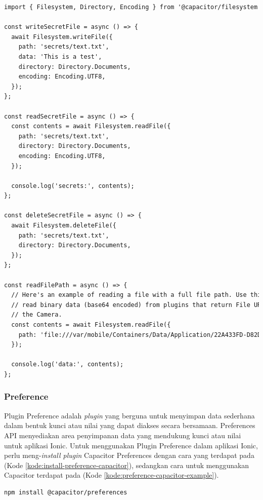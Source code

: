 \begin{lstlisting}[language=HTML, caption=Contoh Kode Penggunaan Filesystem, label=kode:example-of-filesystem-capacitor]
import { Filesystem, Directory, Encoding } from '@capacitor/filesystem';

const writeSecretFile = async () => {
  await Filesystem.writeFile({
    path: 'secrets/text.txt',
    data: 'This is a test',
    directory: Directory.Documents,
    encoding: Encoding.UTF8,
  });
};

const readSecretFile = async () => {
  const contents = await Filesystem.readFile({
    path: 'secrets/text.txt',
    directory: Directory.Documents,
    encoding: Encoding.UTF8,
  });

  console.log('secrets:', contents);
};

const deleteSecretFile = async () => {
  await Filesystem.deleteFile({
    path: 'secrets/text.txt',
    directory: Directory.Documents,
  });
};

const readFilePath = async () => {
  // Here's an example of reading a file with a full file path. Use this to
  // read binary data (base64 encoded) from plugins that return File URIs, such as
  // the Camera.
  const contents = await Filesystem.readFile({
    path: 'file:///var/mobile/Containers/Data/Application/22A433FD-D82D-4989-8BE6-9FC49DEA20BB/Documents/text.txt',
  });

  console.log('data:', contents);
};
\end{lstlisting}

\subsubsection{Preference}
Plugin Preference adalah \textit{plugin} yang berguna untuk menyimpan data sederhana dalam bentuk kunci atau nilai yang dapat diakses secara bersamaan. Preferences API menyediakan area penyimpanan data yang mendukung kunci atau nilai untuk aplikasi Ionic. Untuk menggunakan Plugin Preference dalam aplikasi Ionic, perlu meng-\textit{install plugin} Capacitor Preferences dengan cara yang terdapat pada (Kode \ref{kode:install-preference-capacitor}), sedangkan cara untuk menggunakan Capacitor terdapat pada (Kode \ref{kode:preference-capacitor-example}).

\begin{lstlisting}[language=HTML, caption=Kode untuk Menginstal Plugin Preference, label=kode:install-preference-capacitor]
npm install @capacitor/preferences
\end{lstlisting}

